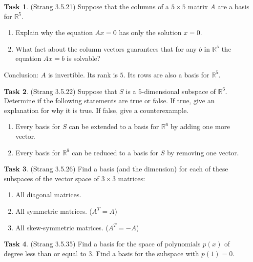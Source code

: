 \documentclass[10pt,]{book}
\theoremstyle{plain}
\theoremstyle{definition}
\numberwithin{equation}{section}
\newtheorem{task}{Task}[chapter]
\begin{document}
\begin{task}
\label{task-111}
(Strang 3.5.21)
        Suppose that the columns of a \(5 \times 5 \) matrix \(A\) are a
        basis for \(\mathbb{R}^5\).
        \begin{enumerate}
\item{}
            Explain why the equation \(Ax = 0\) has only the solution
            \(x=0\).
          \item{}
            What fact about the column vectors guarantees that for any \(b\)
            in \(\mathbb{R}^5\) the equation \(Ax =b\) is solvable?
          \end{enumerate}

        Conclusion: \(A\) is invertible. Its rank is \(5\). Its rows are
        also a basis for \(\mathbb{R}^5\).
      \end{task}
\begin{task}
\label{task-112}
(Strang 3.5.22)
        Suppose that \(S\) is a \(5\)-dimensional subspace of
        \(\mathbb{R}^6\).
        Determine if the following statements are true or false. If true, give
        an explanation for why it is true. If false, give a counterexample.
        \begin{enumerate}
\item{}
            Every basis for \(S\) can be extended to a basis for
            \(\mathbb{R}^6\) by adding one more vector.
          \item{}
            Every basis for \(\mathbb{R}^6\) can be reduced to a basis for
            \(S\) by removing one vector.
          \end{enumerate}
\end{task}
\begin{task}
\label{task-113}
(Strang 3.5.26)
        Find a basis (and the dimension) for each of these subspaces of the vector
        space of \(3\times 3\) matrices:
        \begin{enumerate}
\item{}
            All diagonal matrices.
          \item{}
            All symmetric matrices. (\(A^T = A\))
          \item{}
            All skew-symmetric matrices. (\(A^T = -A\))
          \end{enumerate}
\end{task}
\begin{task}
\label{task-114}
(Strang 3.5.35)
        Find a basis for the space of polynomials \(p(x)\) of degree less than
        or equal to \(3\). Find a basis for the subspace with \(p(1)=0\).
      \end{task}
\clearpage
\typeout{************************************************}
\typeout{************************************************}
\end{document}
